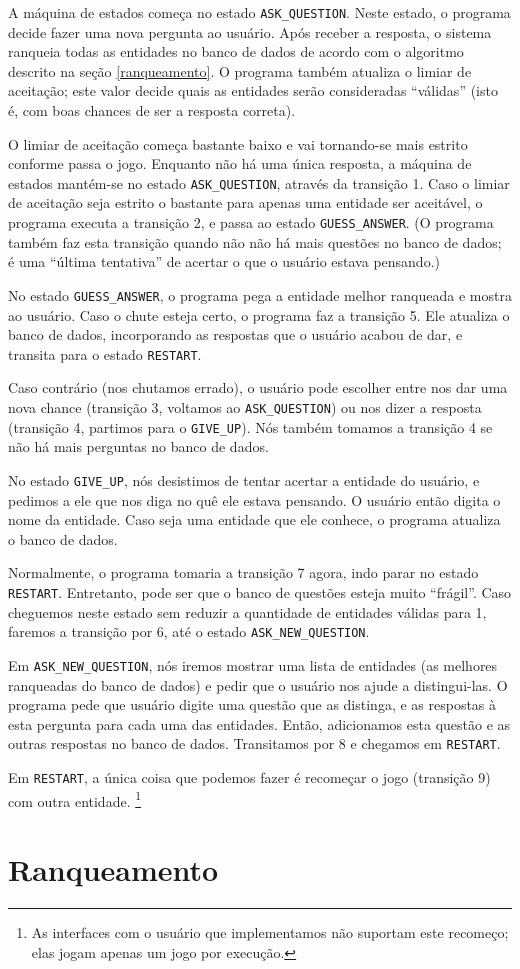 \documentclass{article}
\newcommand{\ask}{\lstinline"ASK_QUESTION"}
\newcommand{\guess}{\lstinline"GUESS_ANSWER"}
\newcommand{\restart}{\lstinline"RESTART"}
\newcommand{\giveup}{\lstinline"GIVE_UP"}
\newcommand{\newquestion}{\lstinline"ASK_NEW_QUESTION"}
\begin{document}
A máquina de estados começa no estado \ask.
Neste estado, o programa decide fazer uma nova pergunta ao usuário.
Após receber a resposta, o sistema ranqueia todas as entidades no banco de dados
de acordo com o algoritmo descrito na seção \ref{ranqueamento}.
O programa também atualiza o limiar de aceitação;
este valor decide quais as entidades serão consideradas ``válidas''
(isto é, com boas chances de ser a resposta correta).

O limiar de aceitação começa bastante baixo e vai tornando-se mais estrito
conforme passa o jogo.
Enquanto não há uma única resposta,
a máquina de estados mantém-se no estado \ask,
através da transição 1.
Caso o limiar de aceitação seja estrito o bastante
para apenas uma entidade ser aceitável,
o programa executa a transição 2,
e passa ao estado \guess.
(O programa também faz esta transição
quando não não há mais questões no banco de dados;
é uma ``última tentativa'' de acertar o que o usuário estava pensando.)

No estado \guess, o programa pega a entidade melhor ranqueada
e mostra ao usuário.
Caso o chute esteja certo, o programa faz a transição 5.
Ele atualiza o banco de dados,
incorporando as respostas que o usuário acabou de dar,
e transita para o estado \restart.

Caso contrário (nos chutamos errado),
o usuário pode escolher entre nos dar uma nova chance
(transição 3, voltamos ao \ask)
ou nos dizer a resposta
(transição 4, partimos para o \giveup).
Nós também tomamos a transição 4 se não há mais perguntas no banco de dados.

No estado \giveup, nós desistimos de tentar acertar a entidade do usuário,
e pedimos a ele que nos diga no quê ele estava pensando.
O usuário então digita o nome da entidade.
Caso seja uma entidade que ele conhece, o programa atualiza o banco de dados.

Normalmente, o programa tomaria a transição 7 agora,
indo parar no estado \restart.
Entretanto, pode ser que o banco de questões esteja muito ``frágil''.
Caso cheguemos neste estado sem reduzir a quantidade de entidades válidas para 1,
faremos a transição por 6, até o estado \newquestion.

Em \newquestion, nós iremos mostrar uma lista de entidades
(as melhores ranqueadas do banco de dados)
e pedir que o usuário nos ajude a distingui-las.
O programa pede que usuário digite uma questão que as distinga,
e as respostas à esta pergunta para cada uma das entidades.
Então, adicionamos esta questão e as outras respostas no banco de dados.
Transitamos por 8 e chegamos em \restart.

Em \restart, a única coisa que podemos fazer é recomeçar o jogo
(transição 9)
com outra entidade.
\footnote{
    As interfaces com o usuário que implementamos
    não suportam este recomeço;
    elas jogam apenas um jogo por execução.
}
\section{Ranqueamento \label{ranqueamento}}
\end{document}
